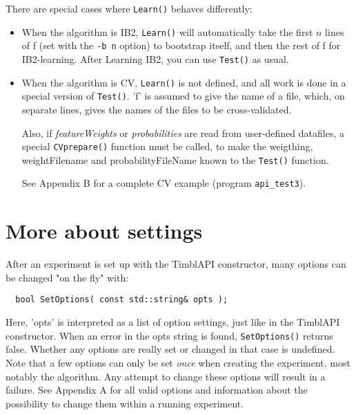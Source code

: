 \documentclass{report}
\begin{document}
There are special cases where {\tt Learn()} behaves differently:

\begin{itemize}
\item When the algorithm is IB2, {\tt Learn()} will automatically take
  the first $n$ lines of f (set with the {\tt -b n} option) to
  bootstrap itself, and then the rest of f for IB2-learning. After
  Learning IB2, you can use {\tt Test()} as usual.

\item When the algorithm is CV, {\tt Learn()} is not defined, and all
  work is done in a special version of {\tt Test()}. 'f' is assumed to
  give the name of a file, which, on separate lines, gives the names
  of the files to be cross-validated.

  Also, if {\em featureWeights}\/ or {\em probabilities}\/ are read from 
  user-defined datafiles, a special {\tt CVprepare()} function must be called, 
  to make the weigthing, weightFilename and probabilityFileName known to the 
{\tt Test()} function.

See Appendix B for a complete CV example (program {\tt api\_test3}).


\end{itemize}

\section{More about settings}

After an experiment is set up with the TimblAPI constructor, many
options can be changed "on the fly" with:

\begin{footnotesize}
\begin{verbatim}
  bool SetOptions( const std::string& opts );
\end{verbatim}
\end{footnotesize}

Here, 'opts' is interpreted as a list of option settings, just like in
the TimblAPI constructor. When an error in the opts string is found,
{\tt SetOptions()} returns false. Whether any options are really set
or changed in that case is undefined. Note that a few options can only
be set {\em once}\/ when creating the experiment, most notably the
algorithm. Any attempt to change these options will result in a
failure.  See Appendix A for all valid options and information about
the possibility to change them within a running experiment.
\end{document}
